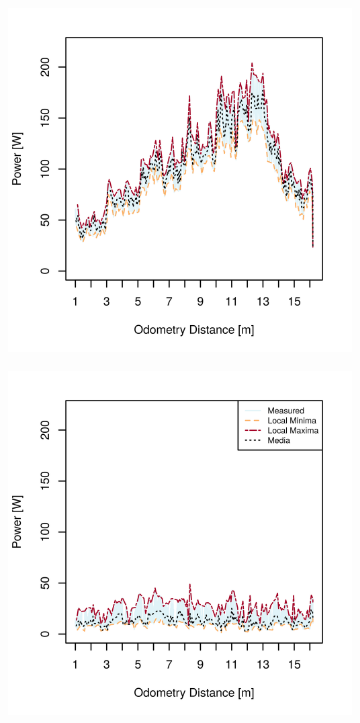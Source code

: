 \begin{figure}[h]
\begin{subfigure}[t]{\subfigureWidth}
        \includegraphics[height=\graphicsHeight]{sections/power-system-design/power-budget/plots/drive-power-draw-on-upslope-terrain.png}
		\label{fig:plot:sub:sherpatt-disaggregated-upslope-terrain-power-draw-drive}
	\end{subfigure}\hfill
    \begin{subfigure}[t]{\subfigureWidth}
        \centering
        \includegraphics[height=\graphicsHeight]{sections/power-system-design/power-budget/plots/suspension-power-draw-on-upslope-terrain.png}

\end{subfigure}
\end{figure}
